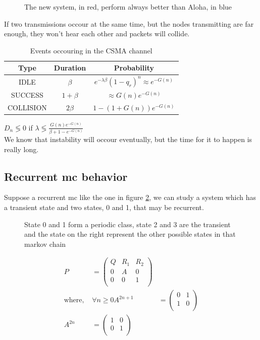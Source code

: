 \begin{figure} \centering
	
	\caption{The new system, in red, perform always better than Aloha, in blue}
	\label{}
\end{figure}
If two transmissions occour at the same time, but the nodes transmitting are far enough, they won't hear each other and packets will collide.

\begin{table}[h!]
	\centering
	\begin{tabular}{|c|c|c|}
		\textbf{Type} & \textbf{Duration} & \textbf{Probability} \\ \hline
		IDLE & $\beta$ & $e^{-\lambda \beta} (1-q_r)^n \approx e^{-G(n)}$ \\
		SUCCESS & $1+\beta$ & $\approx G(n) e^{-G(n)}$ \\
		COLLISION & $2 \beta$ & $1-(1+G(n)) e^{-G(n)}$
	\end{tabular}
	\caption{Events occouring in the CSMA channel}
	\label{TAB:tx_prob}
\end{table}
$D_n \lessgtr 0 $ if $\lambda \lessgtr \frac{G(n) e^{-G(n)}}{\beta + 1 - e^{-G(n)}}$\\
We know that instability will occour eventually, but the time for it to happen is really long.

\subsection{Recurrent \gls{mc} behavior}
Suppose a recurrent \gls{mc} like the one in figure \ref{fig:recurrMC}, we can study a system which has a transient state and two states, 0 and 1,
that may be recurrent.
\begin{figure}[h!]\centering
	
	\caption{ State 0 and 1 form a periodic class, state 2 and 3 are the transient
	and the state on the right represent the other possible states in that markov chain}
	\label{fig:recurrMC}
\end{figure}

\begin{equation}\begin{split}
	P&=\begin{pmatrix}
		Q & R_1 & R_2 \\
		0 & A  & 0 \\
		0 & 0  & 1 \\
	\end{pmatrix}\\
	\text{where, }&\forall n\ge 0
	A^{2n+1}&=\begin{pmatrix}
		0 & 1 \\
		1 & 0 \\
	\end{pmatrix}\\
	A^{2n}&=\begin{pmatrix}
		1 & 0 \\
		0 & 1 \\
	\end{pmatrix}\\
\end{split}\end{equation}

